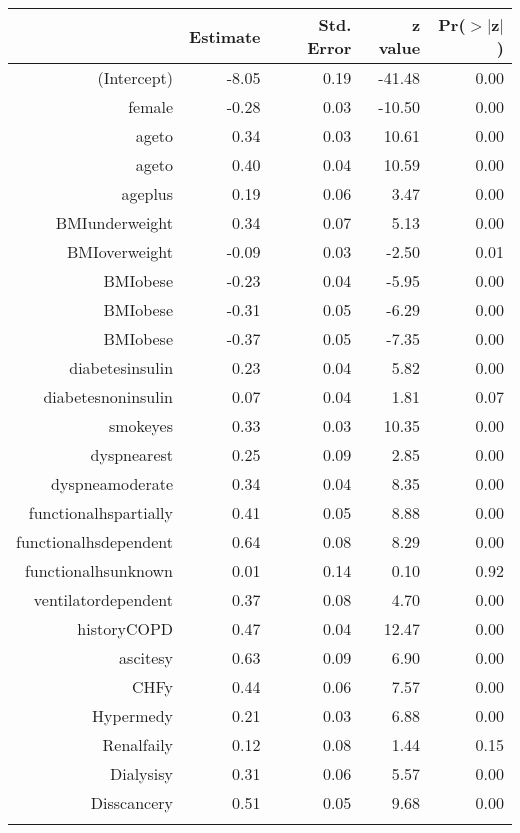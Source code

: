 \bigskip\bigskip
\centering
\begin{tabular}{rrrrr}
  \hline
 & Estimate & Std. Error & z value & Pr($>$$|$z$|$) \\ 
  \hline
(Intercept) & -8.05 & 0.19 & -41.48 & 0.00 \\ 
  female & -0.28 & 0.03 & -10.50 & 0.00 \\ 
  age\-65\-to\-74 & 0.34 & 0.03 & 10.61 & 0.00 \\ 
  age\-75\-to\-84 & 0.40 & 0.04 & 10.59 & 0.00 \\ 
  age\-85\-plus & 0.19 & 0.06 & 3.47 & 0.00 \\ 
  BMI\-underweight & 0.34 & 0.07 & 5.13 & 0.00 \\ 
  BMI\-overweight & -0.09 & 0.03 & -2.50 & 0.01 \\ 
  BMI\-obese\-1 & -0.23 & 0.04 & -5.95 & 0.00 \\ 
  BMI\-obese\-2 & -0.31 & 0.05 & -6.29 & 0.00 \\ 
  BMI\-obese\-3 & -0.37 & 0.05 & -7.35 & 0.00 \\ 
  diabetes\-insulin & 0.23 & 0.04 & 5.82 & 0.00 \\ 
  diabetes\-noninsulin & 0.07 & 0.04 & 1.81 & 0.07 \\ 
  smoke\-yes & 0.33 & 0.03 & 10.35 & 0.00 \\ 
  dyspnea\-rest & 0.25 & 0.09 & 2.85 & 0.00 \\ 
  dyspnea\-moderate & 0.34 & 0.04 & 8.35 & 0.00 \\ 
  functional\-hs\-partially & 0.41 & 0.05 & 8.88 & 0.00 \\ 
  functional\-hs\-dependent & 0.64 & 0.08 & 8.29 & 0.00 \\ 
  functional\-hs\-unknown & 0.01 & 0.14 & 0.10 & 0.92 \\ 
  ventilator\-dependent & 0.37 & 0.08 & 4.70 & 0.00 \\ 
  history\-COPD & 0.47 & 0.04 & 12.47 & 0.00 \\ 
  ascites\-y & 0.63 & 0.09 & 6.90 & 0.00 \\ 
  CHF\-y & 0.44 & 0.06 & 7.57 & 0.00 \\ 
  Hyper\-med\-y & 0.21 & 0.03 & 6.88 & 0.00 \\ 
  Renal\-fail\-y & 0.12 & 0.08 & 1.44 & 0.15 \\ 
  Dialysis\-y & 0.31 & 0.06 & 5.57 & 0.00 \\ 
  Diss\-cancer\-y & 0.51 & 0.05 & 9.68 & 0.00 \\ 
$$
\end{tabular}
